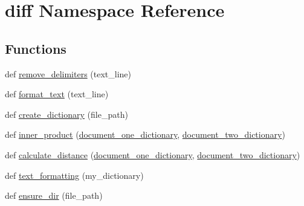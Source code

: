\hypertarget{namespacediff}{}\section{diff Namespace Reference}
\label{namespacediff}
\subsection*{Functions}
\begin{DoxyCompactItemize}
\item 
def \hyperlink{namespacediff_af60a451d448d916b5326b02f0c96147e}{remove\+\_\+delimiters} (text\+\_\+line)
\item 
def \hyperlink{namespacediff_a17722e85e83540a4710fa571f274e460}{format\+\_\+text} (text\+\_\+line)
\item 
def \hyperlink{namespacediff_af7396fb95b2a175d067c1c73c75c49f6}{create\+\_\+dictionary} (file\+\_\+path)
\item 
def \hyperlink{namespacediff_a3a1a3f01a48273670935a0fc45b8975f}{inner\+\_\+product} (\hyperlink{namespacediff_adb8493e93ac22af9aef08d29989bc40d}{document\+\_\+one\+\_\+dictionary}, \hyperlink{namespacediff_ad928e1eb5cb7ebde52f495bf99c78a3b}{document\+\_\+two\+\_\+dictionary})
\item 
def \hyperlink{namespacediff_a0b1fc82894743728455b31d3e9ec3671}{calculate\+\_\+distance} (\hyperlink{namespacediff_adb8493e93ac22af9aef08d29989bc40d}{document\+\_\+one\+\_\+dictionary}, \hyperlink{namespacediff_ad928e1eb5cb7ebde52f495bf99c78a3b}{document\+\_\+two\+\_\+dictionary})
\item 
def \hyperlink{namespacediff_aa2e19dbdbb5368eafd04b0cfe58c59a9}{text\+\_\+formatting} (my\+\_\+dictionary)
\item 
def \hyperlink{namespacediff_ac7ecd54dde7759dd5569ffb765995278}{ensure\+\_\+dir} (file\+\_\+path)
\end{DoxyCompactItemize}
